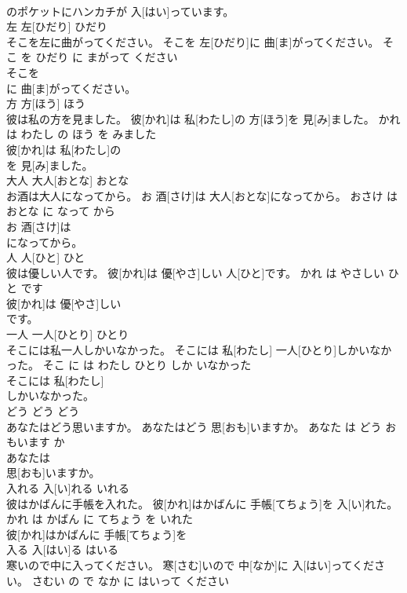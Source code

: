 \documentclass[8pt]{extreport}
\begin{document}
\begin{CJK}{UTF8}{min}
\\	のポケットにハンカチが 入[はい]っています。			
\\	左	左[ひだり]	ひだり	
\\	そこを左に曲がってください。	そこを 左[ひだり]に 曲[ま]がってください。	そこ を ひだり に まがって ください	
\\	そこを
\\	に 曲[ま]がってください。			
\\	方	方[ほう]	ほう	
\\	彼は私の方を見ました。	彼[かれ]は 私[わたし]の 方[ほう]を 見[み]ました。	かれ は わたし の ほう を みました	
\\	彼[かれ]は 私[わたし]の
\\	を 見[み]ました。			
\\	大人	大人[おとな]	おとな	
\\	お酒は大人になってから。	お 酒[さけ]は 大人[おとな]になってから。	おさけ は おとな に なって から	
\\	お 酒[さけ]は
\\	になってから。			
\\	人	人[ひと]	ひと	
\\	彼は優しい人です。	彼[かれ]は 優[やさ]しい 人[ひと]です。	かれ は やさしい ひと です	
\\	彼[かれ]は 優[やさ]しい
\\	です。			
\\	一人	一人[ひとり]	ひとり	
\\	そこには私一人しかいなかった。	そこには 私[わたし] 一人[ひとり]しかいなかった。	そこ に は わたし ひとり しか いなかった	
\\	そこには 私[わたし]
\\	しかいなかった。			
\\	どう	どう	どう	
\\	あなたはどう思いますか。	あなたはどう 思[おも]いますか。	あなた は どう おもいます か	
\\	あなたは
\\	思[おも]いますか。			
\\	入れる	入[い]れる	いれる	
\\	彼はかばんに手帳を入れた。	彼[かれ]はかばんに 手帳[てちょう]を 入[い]れた。	かれ は かばん に てちょう を いれた	
\\	彼[かれ]はかばんに 手帳[てちょう]を
\\	入る	入[はい]る	はいる	
\\	寒いので中に入ってください。	寒[さむ]いので 中[なか]に 入[はい]ってください。	さむい の で なか に はいって ください	

\end{CJK}
\end{document}
